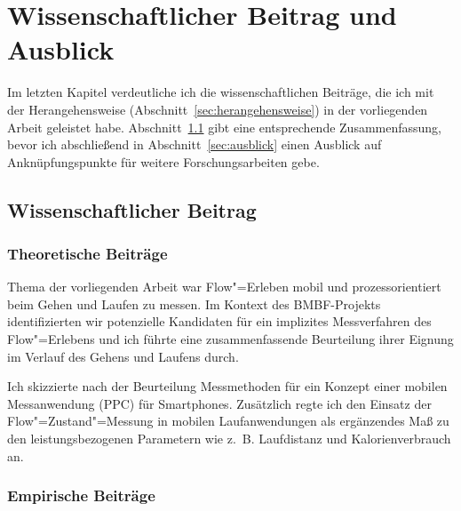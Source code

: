 

\chapter{Wissenschaftlicher Beitrag und Ausblick}

\label{cha:wissenschaftlicher_beitrag_und_ausblick}

Im letzten Kapitel verdeutliche ich die wissenschaftlichen Beiträge, die ich mit der Herangehensweise (Abschnitt~\ref{sec:herangehensweise}) in der vorliegenden Arbeit geleistet habe. Abschnitt~\ref{sec:wissenschaftlicher_beitrag} gibt eine entsprechende Zusammenfassung, bevor ich abschließend in Abschnitt~\ref{sec:ausblick} einen Ausblick auf Anknüpfungspunkte für weitere Forschungsarbeiten gebe.

\section{Wissenschaftlicher Beitrag} 

\label{sec:wissenschaftlicher_beitrag}

\subsection{Theoretische Beiträge} 

\label{sub:theoretische_beitrage}

Thema der vorliegenden Arbeit war Flow"=Erleben mobil und prozessorientiert beim Gehen und Laufen zu messen. Im Kontext des \acs{BMBF}-Projekts identifizierten wir potenzielle Kandidaten für ein implizites Messverfahren des Flow"=Erlebens und ich führte eine zusammenfassende Beurteilung ihrer Eignung im Verlauf des Gehens und Laufens durch. 

Ich skizzierte nach der Beurteilung Messmethoden für ein Konzept einer mobilen Messanwendung (\ac{PPC}) für Smartphones. Zusätzlich regte ich den Einsatz der Flow"=Zustand"=Messung in mobilen Laufanwendungen als ergänzendes Maß zu den leistungsbezogenen Parametern wie z.~B. Laufdistanz und Kalorienverbrauch an.

\subsection{Empirische Beiträge} 

\label{sub:empirische_beitrage}


